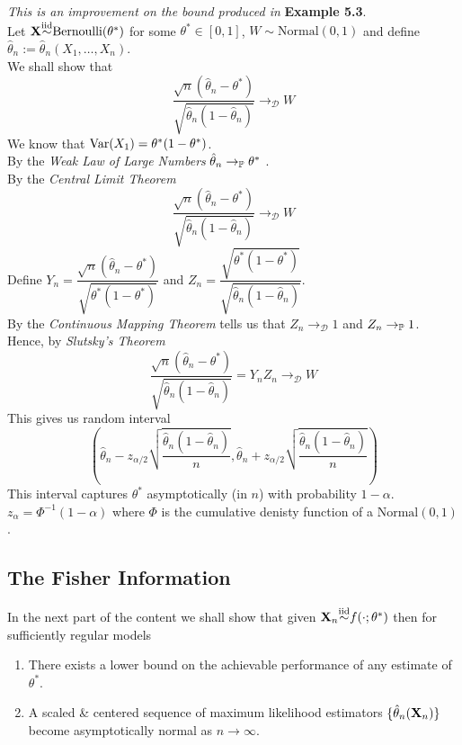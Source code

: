\documentclass[11pt,a4paper]{article}
\begin{document}
\textit{This is an improvement on the bound produced in }\textbf{Example 5.3}.\\
Let $\textbf{X}{\overset{\text{iid}}{\sim}}\text{Bernoulli}(\theta^*)$ for some $\theta^*\in[0,1]$, $W\sim\text{Normal}(0,1)$ and define $\hat{\theta}_n:=\hat{\theta}_n(X_1,\dots,X_n)$.\\
We shall show that
$$\frac{\sqrt{n}(\hat{\theta}_n-\theta^*)}{\sqrt{\hat{\theta}_n(1-\hat{\theta}_n)}}\to_\mathcal{D}W$$
We know that $\mathrm{Var}(X_1)=\theta^*(1-\theta^*)$.\\
By the \textit{Weak Law of Large Numbers} $\hat{\theta}_n\to_{\mathbb{P}}\theta^*$ .\\
By the \textit{Central Limit Theorem}
$$\frac{\sqrt{n}(\hat{\theta}_n-\theta^*)}{\sqrt{\hat{\theta}_n(1-\hat{\theta}_n)}}\to_\mathcal{D}W$$
Define $Y_n=\dfrac{\sqrt{n}(\hat{\theta}_n-\theta^*)}{\sqrt{\theta^*(1-\theta^*)}}$ and $Z_n=\dfrac{\sqrt{\theta^*(1-\theta^*)}}{\sqrt{\hat{\theta}_n(1-\hat{\theta}_n)}}$.\\
By the \textit{Continuous Mapping Theorem} tells us that $Z_n\to_\mathcal{D}1$ and $Z_n\to_{\mathbb{P}}1$.\\
Hence, by \textit{Slutsky's Theorem}
$$\frac{\sqrt{n}(\hat{\theta}_n-\theta^*)}{\sqrt{\hat{\theta}_n(1-\hat{\theta}_n)}}=Y_nZ_n\to_\mathcal{D}W$$
This gives us random interval
$$\left(\hat{\theta}_n-z_{\alpha/2}\sqrt{\frac{\hat{\theta}_n(1-\hat{\theta}_n)}{n}},\hat{\theta}_n+z_{\alpha/2}\sqrt{\frac{\hat{\theta}_n(1-\hat{\theta}_n)}{n}}\right)$$
This interval captures $\theta^*$ asymptotically (in $n$) with probability $1-\alpha$.\\
\nb $z_\alpha=\Phi^{-1}(1-\alpha)$ where $\Phi$ is the cumulative denisty function of a $\text{Normal}(0,1)$.

\subsection{The Fisher Information}

In the next part of the content we shall show that given $\textbf{X}_n{\overset{\text{iid}}{\sim}}f(\cdot;\theta^*)$ then for sufficiently regular models
\begin{enumerate}[label=\roman*)]
	\item There exists a lower bound on the achievable performance of any estimate of $\theta^*$.
	\item A scaled \& centered sequence of maximum likelihood estimators $\{\hat{\theta}_n(\textbf{X}_n)\}$ become asymptotically normal as $n\to\infty$.
\end{enumerate}
\end{document}
